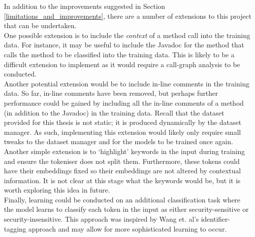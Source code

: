 \noindent
In addition to the improvements suggested in Section \ref{limitations_and_improvements}, there are a number of extensions to this project that can be undertaken. \\

\noindent
One possible extension is to include the \emph{context} of a method call into the training data. For instance, it may be useful to include the Javadoc for the method that calls the method to be classified into the training data. This is likely to be a difficult extension to implement as it would require a call-graph analysis to be conducted. \\ 

\noindent
Another potential extension would be to include in-line comments in the training data. So far, in-line comments have been removed, but perhaps further performance could be gained by including all the in-line comments of a method (in addition to the Javadoc) in the training data. Recall that the dataset provided for this thesis is not static; it is produced dynamically by the dataset manager. As such, implementing this extension would likely only require small tweaks to the dataset manager and for the models to be trained once again. \\

\noindent
Another simple extension is to `highlight' keywords in the input during training and ensure the tokeniser does not split them. Furthermore, these tokens could have their embeddings fixed so their embeddings are not altered by contextual information. It is not clear at this stage what the keywords would be, but it is worth exploring this idea in future.\\

\noindent
Finally, learning could be conducted on an additional classification task where the model learns to classify each token in the input as either security-sensitive or security-insensitive. This approach was inspired by Wang et. al's identifier-tagging approach \cite{identifier_tagging} and may allow for more sophisticated learning to occur.